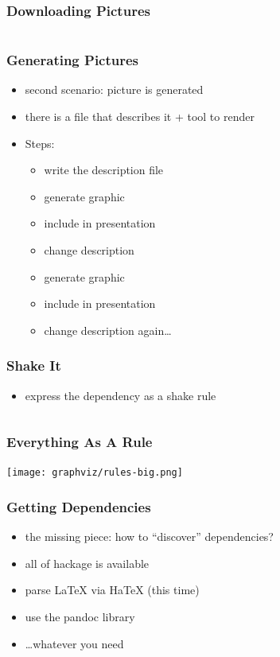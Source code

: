 \documentclass{beamer}
\begin{document}
\begin{frame}
  \frametitle{Downloading Pictures}
    \begin{center}
    \inputminted{haskell}{snippets/download-images.hs}
  \end{center}
\end{frame}

\begin{frame}
  \frametitle{Generating Pictures}
  \begin{itemize}
  \item second scenario: picture is generated
  \item there is a file that describes it + tool to render
  \item Steps:
    \begin{itemize}
    \item write the description file
    \item generate graphic
    \item include in presentation
    \item change description
    \item generate graphic
    \item include in presentation
    \item change description again\ldots{}
    \end{itemize}
  \end{itemize}
\end{frame}

\begin{frame}
  \frametitle{Shake It}
  \begin{itemize}
  \item express the dependency as a shake rule
  \end{itemize}
  \inputminted{haskell}{snippets/graphviz-rule.hs}
\end{frame}

\begin{frame}
  \frametitle{Everything As A Rule}
  \begin{center}
    \texttt{[image: graphviz/rules-big.png]}
  \end{center}
\end{frame}

\begin{frame}
  \frametitle{Getting Dependencies}
  \begin{itemize}
  \item the missing piece: how to ``discover'' dependencies?
  \item all of hackage is available
  \item parse LaTeX via HaTeX (this time)
  \item use the pandoc library
  \item \ldots whatever you need
  \end{itemize}
\end{frame}
\end{document}
